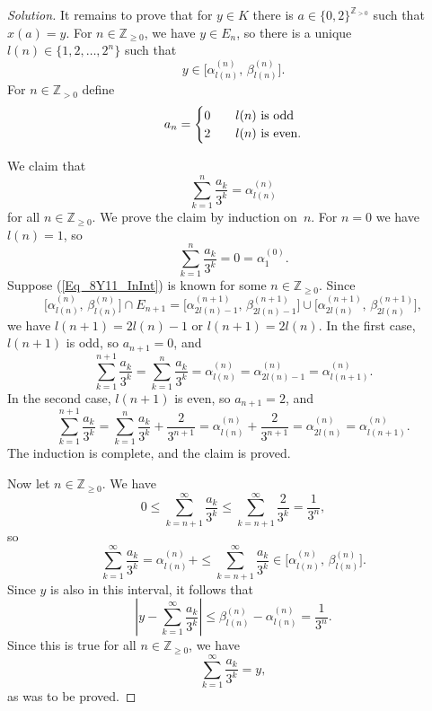 \documentclass[10pt]{amsart}
\newcommand{\I}{\infty}
\theoremstyle{definition}
\newcommand{\af}{\alpha}
\newcommand{\bt}{\beta}
\newcommand{\N}{{\mathbb{Z}}_{> 0}}
\newcommand{\Nz}{{\mathbb{Z}}_{\geq 0}}
\begin{document}
\begin{proof}[Solution]
It remains to prove that for $y \in K$ there is $a \in \{ 0, 2 \}^{\N}$
such that $x (a) = y$.
For $n \in \Nz$,
we have $y \in E_n$,
so there is a unique $l (n) \in \{ 1, 2, \ldots, 2^n \}$
such that
\[
y \in \bigl[ \af_{l (n)}^{(n)}, \, \bt_{l (n)}^{(n)} \bigr].
\]
For $n \in \N$ define
\[
a_n = \begin{cases}
   0 & \hspace*{1em} {\mbox{$l (n)$ is odd}}
        \\
   2 & \hspace*{1em} {\mbox{$l (n)$ is even}}.
\end{cases}
\]

We claim that
%
\begin{equation}\label{Eq_8Y11_InInt}
\sum_{k = 1}^{n} \frac{a_k}{3^k} = \af_{l (n)}^{(n)}
\end{equation}
%
for all $n \in \Nz$.
We prove the claim by induction on~$n$.
For $n = 0$ we have $l (n) = 1$, so
\[
\sum_{k = 1}^{n} \frac{a_k}{3^k}
 = 0
 = \af_1^{(0)}.
\]
Suppose (\ref{Eq_8Y11_InInt}) is known for some $n \in \Nz$.
Since
\[
\bigl[ \af_{l (n)}^{(n)}, \, \bt_{l (n)}^{(n)} \bigr] \cap E_{n + 1}
 = \bigl[ \af_{2 l (n) - 1}^{(n + 1)},
            \, \bt_{2 l (n) - 1}^{(n + 1)} \bigr]
   \cup \bigl[ \af_{2 l (n)}^{(n + 1)},
            \, \bt_{2 l (n)}^{(n + 1)} \bigr],
\]
we have $l (n + 1) = 2 l (n) - 1$ or $l (n + 1) = 2 l (n)$.
In the first case, $l (n + 1)$ is odd,
so $a_{n + 1} = 0$,
and
\[
\sum_{k = 1}^{n + 1} \frac{a_k}{3^k}
 = \sum_{k = 1}^{n} \frac{a_k}{3^k}
 = \af_{l (n)}^{(n)}
 = \af_{2 l (n) - 1}^{(n)}
 = \af_{l (n + 1)}^{(n)}.
\]
In the second case, $l (n + 1)$ is even,
so $a_{n + 1} = 2$,
and
\[
\sum_{k = 1}^{n + 1} \frac{a_k}{3^k}
 = \sum_{k = 1}^{n} \frac{a_k}{3^k} + \frac{2}{3^{n + 1}}
 = \af_{l (n)}^{(n)} + \frac{2}{3^{n + 1}}
 = \af_{2 l (n)}^{(n)}
 = \af_{l (n + 1)}^{(n)}.
\]
The induction is complete, and the claim is proved.

Now let $n \in \Nz$.
We have
\[
0 \leq \sum_{k = n + 1}^{\I} \frac{a_k}{3^k}
  \leq \sum_{k = n + 1}^{\I} \frac{2}{3^k}
  = \frac{1}{3^{n}},
\]
so
\[
\sum_{k = 1}^{\I} \frac{a_k}{3^k}
 = \af_{l (n)}^{(n)} + \leq \sum_{k = n + 1}^{\I} \frac{a_k}{3^k}
 \in \bigl[ \af_{l (n)}^{(n)}, \, \bt_{l (n)}^{(n)} \bigr].
\]
Since $y$ is also in this interval,
it follows that
\[
\left| y - \sum_{k = 1}^{\I} \frac{a_k}{3^k} \right|
  \leq \bt_{l (n)}^{(n)} - \af_{l (n)}^{(n)}
  = \frac{1}{3^n}.
\]
Since this is true for all $n \in \Nz$,
we have
\[
\sum_{k = 1}^{\I} \frac{a_k}{3^k}
 = y,
\]
as was to be proved.
\end{proof}
\end{document}
